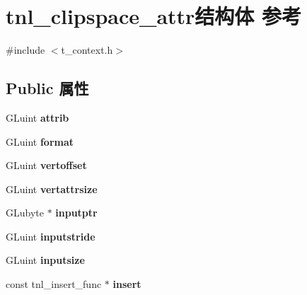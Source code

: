 \hypertarget{structtnl__clipspace__attr}{}\section{tnl\+\_\+clipspace\+\_\+attr结构体 参考}
\label{structtnl__clipspace__attr}


{\ttfamily \#include $<$t\+\_\+context.\+h$>$}

\subsection*{Public 属性}
\begin{DoxyCompactItemize}
\item 
\mbox{\label{structtnl__clipspace__attr_a7d9b4edb066aee66c589e45c9c4b5fbe}} 
G\+Luint {\bfseries attrib}
\item 
\mbox{\label{structtnl__clipspace__attr_a902addc4fe72392d2509fc98447ece93}} 
G\+Luint {\bfseries format}
\item 
\mbox{\label{structtnl__clipspace__attr_a542e090e2aea85b22c4f73637a94b16b}} 
G\+Luint {\bfseries vertoffset}
\item 
\mbox{\label{structtnl__clipspace__attr_a5234d1fbf73d9567c2ce57818c0042ad}} 
G\+Luint {\bfseries vertattrsize}
\item 
\mbox{\label{structtnl__clipspace__attr_a679bdc5fb464e82944e6590778aa65a7}} 
G\+Lubyte $\ast$ {\bfseries inputptr}
\item 
\mbox{\label{structtnl__clipspace__attr_a0f7b84f7f0f6cc5b156ee420e289b539}} 
G\+Luint {\bfseries inputstride}
\item 
\mbox{\label{structtnl__clipspace__attr_ac1c2113944b0e4cca8c67035af701513}} 
G\+Luint {\bfseries inputsize}
\item 
\mbox{\label{structtnl__clipspace__attr_a715005136227ac9ecd6b2a54decdcd5d}} 
const tnl\+\_\+insert\+\_\+func $\ast$ {\bfseries insert}

\end{DoxyCompactItemize}
